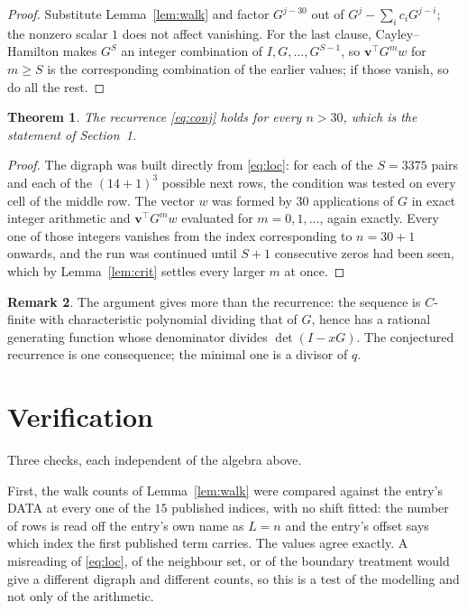 \documentclass[11pt,a4paper]{article}
\theoremstyle{plain}
\newtheorem{theorem}{Theorem}
\theoremstyle{definition}
\newtheorem{remark}[theorem]{Remark}
\begin{document}
\begin{proof}
Substitute Lemma~\ref{lem:walk} and factor $G^{j-30}$ out of
$G^{j}-\sum_ic_iG^{j-i}$; the nonzero scalar $1$ does not affect
vanishing. For the last clause, Cayley--Hamilton makes $G^{S}$ an integer combination of
$I,G,\dots,G^{S-1}$, so $\mathbf{v}^{\!\top}G^{m}w$ for $m\ge S$ is the corresponding
combination of the earlier values; if those vanish, so do all the rest.
\end{proof}

\begin{theorem}
The recurrence \eqref{eq:conj} holds for every $n>30$, which is the statement of
Section~1.
\end{theorem}

\begin{proof}
The digraph was built directly from \eqref{eq:loc}: for each of the $S=3375$ pairs and each
of the $(14+1)^{3}$ possible next rows, the condition was tested on every cell of
the middle row. The vector $w$ was formed by $30$ applications of $G$ in exact integer
arithmetic and $\mathbf{v}^{\!\top}G^{m}w$ evaluated for $m=0,1,\dots$, again exactly.
Every one of those integers vanishes from the index corresponding to $n=30+1$ onwards,
and the run was continued until $S+1$ consecutive zeros had been seen, which by
Lemma~\ref{lem:crit} settles every larger $m$ at once.
\end{proof}

\begin{remark}
The argument gives more than the recurrence: the sequence is $C$-finite with characteristic
polynomial dividing that of $G$, hence has a rational generating function whose denominator
divides $\det(I-xG)$. The conjectured recurrence is one consequence; the minimal one is a
divisor of $q$.
\end{remark}

\section{Verification}

Three checks, each independent of the algebra above.

First, the walk counts of Lemma~\ref{lem:walk} were compared against the entry's DATA at
every one of the $15$ published indices, with no shift fitted: the number of rows is
read off the entry's own name as $L=n$ and the entry's offset says which index the first
published term carries. The values agree exactly. A misreading of \eqref{eq:loc}, of the
neighbour set, or of the boundary treatment would give a different digraph and different
counts, so this is a test of the modelling and not only of the arithmetic.
\end{document}
